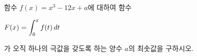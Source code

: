 함수 $f(x)=x^3-12x+a$에 대하여 함수 \par\smallskip\noindent\hspace*{1.5em}$F(x)=\displaystyle\int_{0}^{x} f(t)\mkern3mu dt$\par\smallskip\noindent 가 오직 하나의 극값을 갖도록 하는 양수 $a$의 최솟값을 구하시오.
